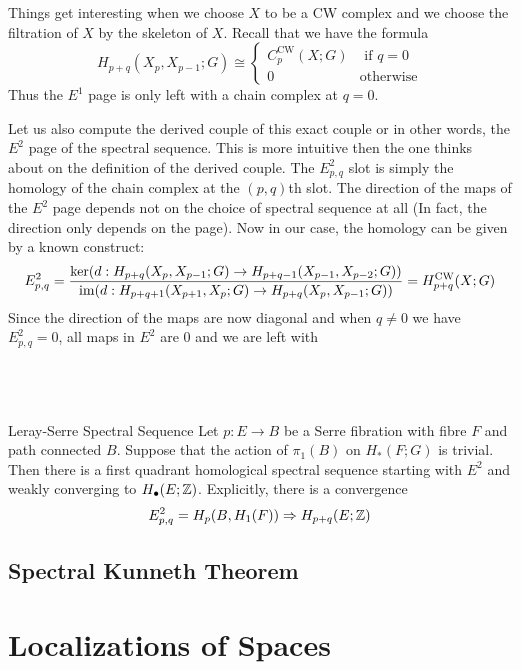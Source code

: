 \documentclass[a4paper]{article}
\begin{document}
Things get interesting when we choose $X$ to be a CW complex and we choose the filtration of $X$ by the skeleton of $X$. Recall that we have the formula $$H_{p+q}(X_p,X_{p-1};G)\cong\begin{cases}
C_p^\text{CW}(X;G) & \text{ if } q=0\\
0 & \text{otherwise}
\end{cases}$$ Thus the $E^1$ page is only left with a chain complex at $q=0$. 

Let us also compute the derived couple of this exact couple or in other words, the $E^2$ page of the spectral sequence. This is more intuitive then the one thinks about on the definition of the derived couple. The $E_{p,q}^2$ slot is simply the homology of the chain complex at the $(p,q)$th slot. The direction of the maps of the $E^2$ page depends not on the choice of spectral sequence at all (In fact, the direction only depends on the page). Now in our case, the homology can be given by a known construct: $$E_{p,q}^2=\frac{\ker(d:H_{p+q}(X_p,X_{p-1};G)\to H_{p+q-1}(X_{p-1},X_{p-2};G))}{\operatorname{im}(d:H_{p+q+1}(X_{p+1},X_p;G)\to H_{p+q}(X_p,X_{p-1};G))}=H_{p+q}^\text{CW}(X;G)$$ Since the direction of the maps are now diagonal and when $q\neq 0$ we have $E_{p,q}^2=0$, all maps in $E^2$ are $0$ and we are left with \\~\\
\\~\\

\begin{thm}{Leray-Serre Spectral Sequence}{} Let $p:E\to B$ be a Serre fibration with fibre $F$ and path connected $B$. Suppose that the action of $\pi_1(B)$ on $H_\ast(F;G)$ is trivial. Then there is a first quadrant homological spectral sequence starting with $E^2$ and weakly converging to $H_\bullet(E;\mathbb{Z})$. Explicitly, there is a convergence $$E_{p,q}^2=H_p(B,H_1(F))\Rightarrow H_{p+q}(E;\mathbb{Z})$$
\end{thm}

\subsection{Spectral Kunneth Theorem}

\pagebreak
\section{Localizations of Spaces}
\end{document}
